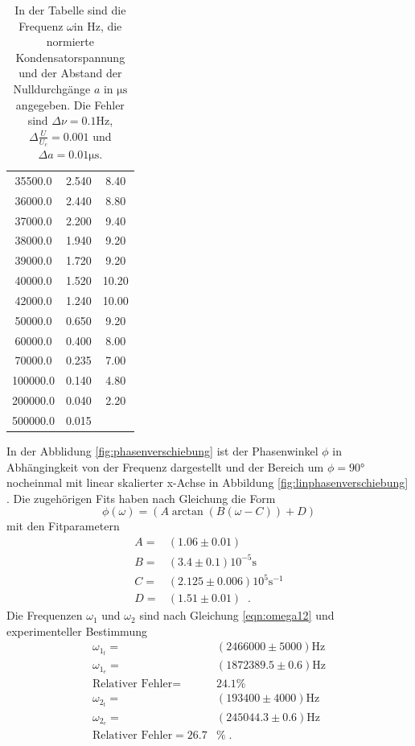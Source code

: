 \begin{table}
\begin{tabular}{c c c}
       35500.0  &  2.540  &  8.40  \\
       36000.0  &  2.440  &  8.80  \\
       37000.0  &  2.200  &  9.40  \\
       38000.0  &  1.940  &  9.20  \\
       39000.0  &  1.720  &  9.20  \\
       40000.0  &  1.520  & 10.20  \\
       42000.0  &  1.240  & 10.00  \\
       50000.0  &  0.650  &  9.20  \\
       60000.0  &  0.400  &  8.00  \\
       70000.0  &  0.235  &  7.00  \\
      100000.0  &  0.140  &  4.80  \\
      200000.0  &  0.040  &  2.20  \\
      500000.0  &  0.015  &        \\
  \end{tabular}
  \caption{In der Tabelle sind die Frequenz $\omega$in $\si{\hertz}$, die normierte
  Kondensatorspannung und der Abstand der Nulldurchgänge $a$ in $\si{\micro\second}$
  angegeben. Die Fehler sind $\Delta\nu=0.1\si{\hertz}$, $ \Delta\frac{U}{U_c}=0.001$
  und $\Delta a=0.01\si{\micro\second}$.}
  \label{fig:Messwerte}
\end{table}
In der Abblidung \ref{fig:phasenverschiebung} ist der Phasenwinkel $\phi$ in Abhängingkeit
von der Frequenz dargestellt und der Bereich um $\phi=90°$ nocheinmal mit
linear skalierter x-Achse in Abbildung \ref{fig:linphasenverschiebung} .
Die zugehörigen Fits haben nach Gleichung die Form
\begin{equation}
  \phi(\omega)=(A\arctan(B(\omega-C))+D)
\end{equation}
  mit den Fitparametern
\begin{align*}
  A=&(1.06\pm0.01)\\
  B=&(3.4\pm0.1)10^{-5}\si{\second}\\
  C=&(2.125\pm0.006)10^{5}\si{\second}^{-1}\\
  D=&(1.51\pm0.01)\;\;.
\end{align*}
Die Frequenzen $\omega_{1}$ und $\omega_{2}$  sind nach Gleichung \eqref{eqn:omega12}
und experimenteller Bestimmung
\begin{align*}
  \omega_{1_t}=&(2466000\pm5000)\si{\hertz}\\
  \omega_{1_e}=&(1872389.5\pm0.6)\si{\hertz}\\
  \text{Relativer Fehler}=&24.1\%\\
  \omega_{2_t}=&(193400\pm4000)\si{\hertz}\\
  \omega_{2_e}=&(245044.3\pm0.6)\si{\hertz}\\
  \text{Relativer Fehler}=26.7&\%\;.
\end{align*}
